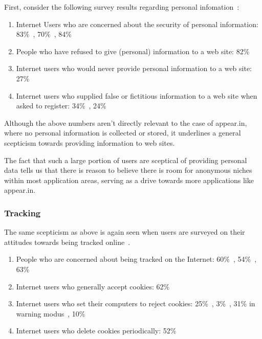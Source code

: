 First, consider the following survey results regarding personal infomation~\cite{Teltzrow2004}:

\begin{enumerate}
  \item Internet Users who are concerned about the security of personal information: 83\%~\cite{CyberDialogue2001}, 70\%~\cite{Behrens2001}, 84\%~\cite{Fox2000}
  \item People who have refused to give (personal) information to a web site: 82\%~\cite{Culnan2001}
  \item Internet users who would never provide personal information to a web site: 27\%~\cite{Fox2000}
  \item Internet users who supplied false or fictitious information to a web site when asked to register: 34\%~\cite{Culnan2001}, 24\%~\cite{Fox2000}
\end{enumerate}

Although the above numbers aren't directly relevant to the case of appear.in, where no personal information is collected or stored, it underlines a general scepticism towards providing information to web sites.

The fact that such a large portion of users are sceptical of providing personal data tells us that there is reason to believe there is room for anonymous niches within most application areas, serving as a drive towards more applications like appear.in.

\subsubsection{Tracking}

The same scepticism as above is again seen when users are surveyed on their attitudes towards being tracked online~\cite{Teltzrow2004}.

\begin{enumerate}
  \item People who are concerned about being tracked on the Internet: 60\%~\cite{CyberDialogue2001}, 54\%~\cite{Fox2000}, 63\%~\cite{Harris2000}
  \item Internet users who generally accept cookies: 62\%~\cite{PersonalizationConsortium2000}
  \item Internet users who set their computers to reject cookies: 25\%~\cite{Culnan2001}, 3\%~\cite{CyberDialogue2001}, 31\% in warning modus~\cite{CyberDialogue2001}, 10\%\cite{Fox2000}
  \item Internet users who delete cookies periodically: 52\%~\cite{PersonalizationConsortium2000}
\end{enumerate}


